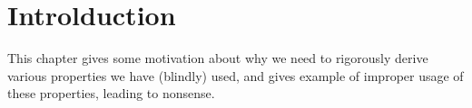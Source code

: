 \chapter{Introlduction}\label{ch 1}
\begin{note}
This chapter gives some motivation about why we need to rigorously derive various properties we have (blindly) used, and gives example of improper usage of these properties, leading to nonsense.
\end{note}